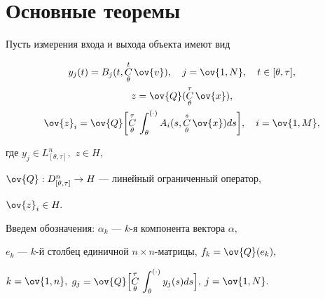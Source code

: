 \section{Основные теоремы}





Пусть измерения входа и выхода объекта имеют вид


\begin{gather}


y_j(t) = B_j(t,\updown{\theta}{t} \ov{v}),\quad j=\ov{1,N},\quad


t\in[\theta,\tau], \\


z=\ov{Q}(\updown{\theta}{\tau} \ov{x}),\\


\ov{z}_i = \ov{Q}\biggl[\updown{\theta}{\tau}\int_{\theta}^{(\cdot)}


A_i(s,\updown{\theta}{s} \ov{x})ds\biggr],\quad i=\ov{1,M},


\end{gather}


где $y_j\in L^n_{[\theta,\tau]},$ $z\in H,$


$\ov{Q}: D^n_{[\theta,\tau]}\to H$ --- линейный ограниченный оператор,


$\ov{z}_i\in H.$





Введем обозначения: $\alpha_k$ --- $k$-я компонента вектора $\alpha,$


$e_k$ --- $k$-й столбец единичной $n\times n$-матрицы, $f_k=\ov{Q}(e_k),$


$k=\ov{1,n},$ ${\displaystyle g_j=\ov{Q}\Bigl[\updown{\theta}{\tau}


\int_{\theta}^{(\cdot)} y_j(s)ds\Bigr],}$ $j=\ov{1,N}.$





